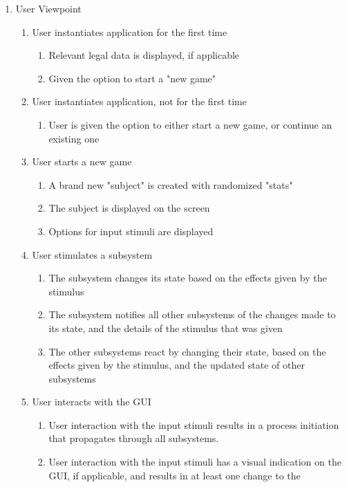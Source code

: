 \documentclass[]{article}
\begin{document}
\begin{enumerate}
	\item User Viewpoint
	\begin{enumerate}
	    \item User instantiates application for the first time
	    \begin{enumerate}
	        \item Relevant legal data is displayed, if applicable
	        \item Given the option to start a "new game"
	    \end{enumerate}
	    \item User instantiates application, not for the first time
	    \begin{enumerate}
	        \item User is given the option to either start a new game, or continue an existing one
	    \end{enumerate}
	    \item User starts a new game
	    \begin{enumerate}
	        \item A brand new "subject" is created with randomized "stats"
	        \item The subject is displayed on the screen
	        \item Options for input stimuli are displayed
	    \end{enumerate}
	    \item User stimulates a subsystem
	    \begin{enumerate}
	        \item The subsystem changes its state based on the effects given by the stimulus
	        \item The subsystem notifies all other subsystems of the changes made to its state, and the details of the stimulus that was given
	        \item The other subsystems react by changing their state, based on the effects given by the stimulus, and the updated state of other
	        subsystems
	    \end{enumerate}
		\item User interacts with the GUI
		\begin{enumerate}
			\item User interaction with the input stimuli results in a process initiation that propagates through all subsystems.
			\item User interaction with the input stimuli has a visual indication on the GUI, if applicable, and results in at least one change to the

\end{enumerate}
\end{enumerate}
\end{enumerate}
\end{document}
